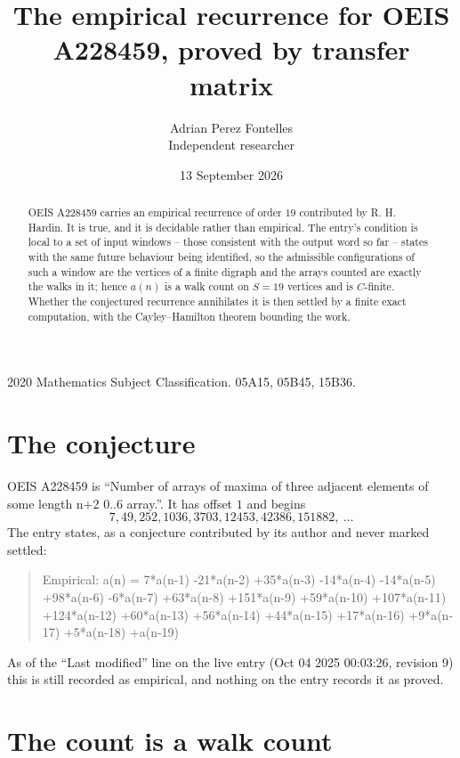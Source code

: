 \documentclass[11pt,a4paper]{article}
\title{The empirical recurrence for OEIS A228459, proved by transfer matrix}
\author{Adrian Perez Fontelles\\ \small Independent researcher}
\date{13 September 2026}
\theoremstyle{plain}
\theoremstyle{definition}
\begin{document}
\maketitle

\begin{abstract}
OEIS A228459 carries an empirical recurrence of order $19$ contributed by R. H. Hardin. It is
true, and it is decidable rather than empirical. The entry's condition is local to a set of input windows -- those consistent with the output word so far -- states with the same future behaviour being identified, so
the admissible configurations of such a window are the vertices of a finite digraph and the
arrays counted are exactly the walks in it; hence $a(n)$ is a walk count on $S=19$ vertices
and is $C$-finite. Whether the conjectured recurrence annihilates it is then settled by a
finite exact computation, with the Cayley--Hamilton theorem bounding the work.
\end{abstract}

\noindent\small 2020 Mathematics Subject Classification. 05A15, 05B45, 15B36.\normalsize

\section{The conjecture}

OEIS A228459 is ``Number of arrays of maxima of three adjacent elements of some length n+2 0..6 array.''. It has offset $1$ and begins
\[
7, 49, 252, 1036, 3703, 12453, 42386, 151882,\ \dots
\]
The entry states, as a conjecture contributed by its author and never marked settled:
\begin{quote}
Empirical: a(n) = 7*a(n-1) -21*a(n-2) +35*a(n-3) -14*a(n-4) -14*a(n-5) +98*a(n-6) -6*a(n-7) +63*a(n-8) +151*a(n-9) +59*a(n-10) +107*a(n-11) +124*a(n-12) +60*a(n-13) +56*a(n-14) +44*a(n-15) +17*a(n-16) +9*a(n-17) +5*a(n-18) +a(n-19)
\end{quote}
As of the ``Last modified'' line on the live entry (Oct 04 2025 00:03:26, revision 9) this is still
recorded as empirical, and nothing on the entry records it as proved.

\section{The count is a walk count}
\end{document}
